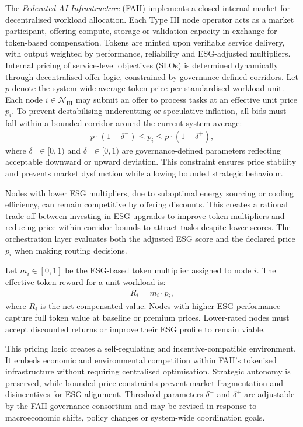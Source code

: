 \documentclass[oneside,10pt]{swissi}
\begin{document}
The \textit{Federated AI Infrastructure} (FAII) implements a closed internal market for decentralised workload allocation. Each Type III node operator acts as a market participant, offering compute, storage or validation capacity in exchange for token-based compensation. Tokens are minted upon verifiable service delivery, with output weighted by performance, reliability and ESG-adjusted multipliers. Internal pricing of service-level objectives (SLOs) is determined dynamically through decentralised offer logic, constrained by governance-defined corridors. Let \( \bar{p} \) denote the system-wide average token price per standardised workload unit. Each node \( i \in \mathcal{N}_{\text{III}} \) may submit an offer to process tasks at an effective unit price \( p_i \). To prevent destabilising undercutting or speculative inflation, all bids must fall within a bounded corridor around the current system average:
\begin{align}
\bar{p} \cdot (1 - \delta^-) \leq p_i \leq \bar{p} \cdot (1 + \delta^+),
\end{align}
where \( \delta^- \in [0,1) \) and \( \delta^+ \in [0,1) \) are governance-defined parameters reflecting acceptable downward or upward deviation. This constraint ensures price stability and prevents market dysfunction while allowing bounded strategic behaviour.

Nodes with lower ESG multipliers, due to suboptimal energy sourcing or cooling efficiency, can remain competitive by offering discounts. This creates a rational trade-off between investing in ESG upgrades to improve token multipliers and reducing price within corridor bounds to attract tasks despite lower scores. The orchestration layer evaluates both the adjusted ESG score and the declared price \( p_i \) when making routing decisions.

Let \( m_i \in [0,1] \) be the ESG-based token multiplier assigned to node \( i \). The effective token reward for a unit workload is:
\begin{align}
R_i = m_i \cdot p_i,
\end{align}
where \( R_i \) is the net compensated value. Nodes with higher ESG performance capture full token value at baseline or premium prices. Lower-rated nodes must accept discounted returns or improve their ESG profile to remain viable.

This pricing logic creates a self-regulating and incentive-compatible environment. It embeds economic and environmental competition within FAII’s tokenised infrastructure without requiring centralised optimisation. Strategic autonomy is preserved, while bounded price constraints prevent market fragmentation and disincentives for ESG alignment. Threshold parameters \( \delta^- \) and \( \delta^+ \) are adjustable by the FAII governance consortium and may be revised in response to macroeconomic shifts, policy changes or system-wide coordination goals.
\end{document}
